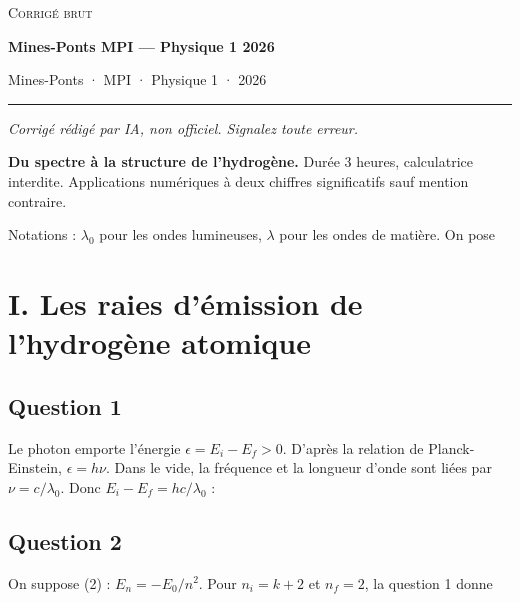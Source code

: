 \documentclass[11pt,a4paper]{article}
\newcommand{\equationajustee}[1]{%
  \sbox{\boiteequation}{$\displaystyle #1$}%
  \ifdim\wd\boiteequation>\linewidth
    \[\resizebox{\linewidth}{!}{\usebox{\boiteequation}}\]%
  \else
    \[#1\]%
  \fi}
\begin{document}
\thispagestyle{plain}
\begin{center}
  {\small\scshape Corrigé brut}\par\smallskip
  {\LARGE\bfseries Mines-Ponts MPI — Physique 1 2026\par}\medskip
  {\large Mines-Ponts · MPI · Physique 1 · 2026\par}
\end{center}
\vspace{2pt}\hrule\vspace{8pt}

\emph{Corrigé rédigé par IA, non officiel. Signalez toute erreur.}

\textbf{Du spectre à la structure de l'hydrogène.} Durée 3 heures, calculatrice interdite. Applications numériques à deux chiffres significatifs sauf mention contraire.

Notations : \(\lambda_0\) pour les ondes lumineuses, \(\lambda\) pour les ondes de matière. On pose

\equationajustee{k_e=\frac{e^2}{4\pi\varepsilon_0}}

\equationajustee{\hbar=\frac{h}{2\pi}}

\hypertarget{i.-les-raies-duxe9mission-de-lhydroguxe8ne-atomique}{%
\section{I. Les raies d'émission de l'hydrogène atomique}\label{i.-les-raies-duxe9mission-de-lhydroguxe8ne-atomique}}

\hypertarget{question-1}{%
\subsection{Question 1}\label{question-1}}

Le photon emporte l'énergie \(\epsilon=E_i-E_f>0\). D'après la relation de Planck-Einstein, \(\epsilon=h\nu\). Dans le vide, la fréquence et la longueur d'onde sont liées par \(\nu=c/\lambda_0\). Donc \(E_i-E_f=hc/\lambda_0\) :

\equationajustee{\boxed{\lambda_0=\frac{hc}{E_i-E_f}}}

\hypertarget{question-2}{%
\subsection{Question 2}\label{question-2}}

On suppose (2) : \(E_n=-E_0/n^2\). Pour \(n_i=k+2\) et \(n_f=2\), la question 1 donne
\end{document}
